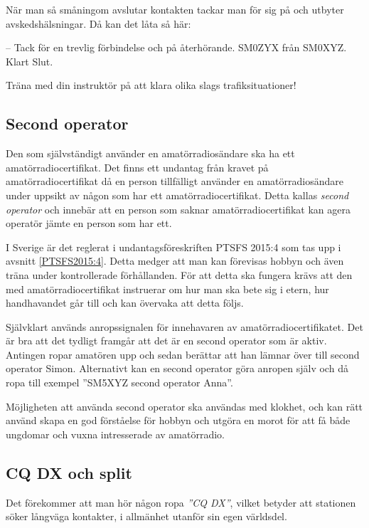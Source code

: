 När man så småningom avslutar kontakten tackar man för sig på och utbyter
avskedshälsningar. Då kan det låta så här:

-- Tack för en trevlig förbindelse och på återhörande. SM0ZYX från
SM0XYZ. Klart Slut.

Träna med din instruktör på att klara olika slags trafiksituationer!

\subsection{Second operator}
\label{secondoperator}

Den som självständigt använder en amatörradiosändare ska ha ett
amatörradiocertifikat.
Det finns ett undantag från kravet på amatörradiocertifikat då en person
tillfälligt använder en amatörradiosändare under uppsikt av någon som har ett
amatörradiocertifikat.
Detta kallas \emph{second operator} och innebär att en person som saknar
amatörradiocertifikat kan agera operatör jämte en person som har ett.

I Sverige är det reglerat i undantagsföreskriften PTSFS 2015:4 som tas upp i
avsnitt \ref{PTSFS2015:4}.
Detta medger att man kan förevisas hobbyn och även träna under kontrollerade
förhållanden.
För att detta ska fungera krävs att den med amatörradiocertifikat instruerar
om hur man ska bete sig i etern, hur handhavandet går till och kan övervaka
att detta följs.

Självklart används anropssignalen för innehavaren av amatörradiocertifikatet.
Det är bra att det tydligt framgår att det är en second operator som är aktiv.
Antingen ropar amatören upp och sedan berättar att han lämnar över till second
operator Simon.
Alternativt kan en second operator göra anropen själv och då ropa till exempel
''SM5XYZ second operator Anna''.

Möjligheten att använda second operator ska användas med klokhet, och kan rätt
använd skapa en god förståelse för hobbyn och utgöra en morot för att få både
ungdomar och vuxna intresserade av amatörradio.

\subsection{CQ DX och split}

Det förekommer att man hör någon ropa \emph{''CQ DX''}, vilket betyder att
stationen söker långväga kontakter, i allmänhet utanför sin egen världsdel.

